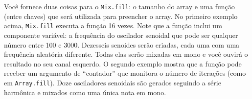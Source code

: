 Você fornece duas coisas para o \texttt{Mix.fill}: o tamanho do array e uma função (entre chaves) que será utilizada para preencher o array. No primeiro exemplo acima, \texttt{Mix.fill} executa a função 16 vezes. Note que a função inclui um componente variável: a frequência do oscilador senoidal que pode ser qualquer número entre 100 e 3000. Dezesseis senoides serão criadas, cada uma com uma frequência aleatória diferente. Todas elas serão mixadas em mono e você ouvirá o resultado no seu canal esquerdo.
O segundo exemplo mostra que a função pode receber um argumento de “contador” que monitora o número de iterações (como em \texttt{Array.fill}). 
Doze osciladores senoidais são gerados seguindo a série harmônica e mixados como uma única nota em mono.
